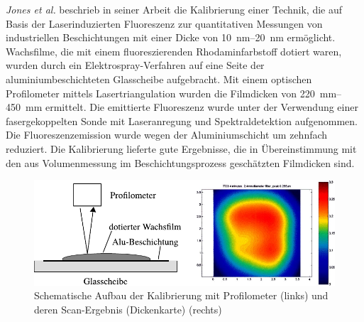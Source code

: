 \textit{Jones et al.} beschrieb in seiner Arbeit \cite{jones_2001} die Kalibrierung einer Technik, die auf Basis der Laserinduzierten Fluoreszenz zur quantitativen Messungen von industriellen Beschichtungen mit einer Dicke von \SIrange{10}{20}{\nano\meter} ermöglicht.
Wachsfilme, die mit einem fluoreszierenden Rhodaminfarbstoff dotiert waren, wurden durch ein Elektrospray-Verfahren auf eine Seite der aluminiumbeschichteten Glasscheibe aufgebracht.
Mit einem optischen Profilometer mittels Lasertriangulation wurden die Filmdicken von \SIrange{220}{450}{\milli\meter} ermittelt.
Die emittierte Fluoreszenz wurde unter der Verwendung einer fasergekoppelten Sonde mit Laseranregung und Spektraldetektion aufgenommen.
Die Fluoreszenzemission wurde wegen der Aluminiumschicht um zehnfach reduziert.
Die Kalibrierung lieferte gute Ergebnisse, die in Übereinstimmung mit den aus Volumenmessung im Beschichtungsprozess geschätzten Filmdicken sind.
\begin{figure}[htb]
    \centering
    \includegraphics[]{./images/schematic_profilometer_and_scan_result_jones.pdf}
    \caption{Schematische Aufbau der Kalibrierung mit Profilometer (links) und deren Scan-Ergebnis (Dickenkarte) (rechts) \cite{jones_2001}}
    \label{fig:aufbau_laserinduzierte_kalibrierung_jones}
\end{figure}
%
